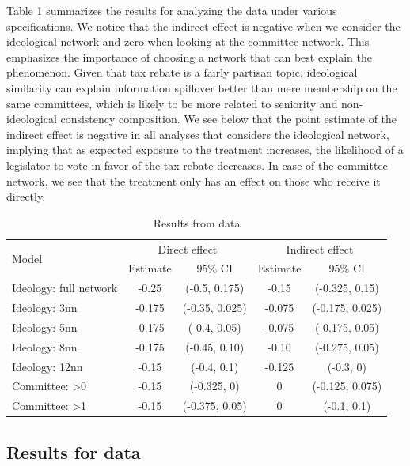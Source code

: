 \documentclass[12pt]{article}
\begin{document}
Table 1 summarizes the results for analyzing the \citet{butler2011can} data under various specifications. We notice that the indirect effect is negative when we consider the ideological network and zero when looking at the committee network. This emphasizes the importance of choosing a network that can best explain the phenomenon. Given that tax rebate is a fairly partisan topic, ideological similarity can explain information spillover better than mere membership on the same committees, which is likely to be more related to seniority and non-ideological consistency composition. We see below that the point estimate of the indirect effect is negative in all analyses that considers the ideological network, implying that as expected exposure to the treatment increases, the likelihood of a legislator to vote in favor of the tax rebate decreases. In case of the committee network, we see that the treatment only has an effect on those who receive it directly.

\begin{table}[h]
\centering
\begin{tabular}{lcccc}
\toprule
\multirow{2}{*}{Model} & \multicolumn{2}{c}{Direct effect} & \multicolumn{2}{c}{Indirect effect} \\
\cmidrule(l){2-3} \cmidrule(l){4-5}
 & Estimate & 95\% CI & Estimate & 95\% CI \\
\midrule
Ideology: full network  & -0.25 & (-0.5, 0.175) & -0.15 & (-0.325, 0.15)\\
Ideology: 3nn & -0.175 & (-0.35, 0.025) & -0.075 & (-0.175, 0.025)\\
Ideology: 5nn & -0.175 & (-0.4, 0.05) & -0.075 & (-0.175, 0.05)\\
Ideology: 8nn & -0.175 & (-0.45, 0.10) & -0.10 & (-0.275, 0.05)\\
Ideology: 12nn & -0.15 &(-0.4,  0.1) & -0.125 & (-0.3, 0)\\
Committee: >0& -0.15 & (-0.325, 0) & 0 & (-0.125, 0.075)\\
Committee: >1 & -0.15 & (-0.375, 0.05) & 0 & (-0.1, 0.1)\\
\bottomrule
\end{tabular}
\caption{Results from \citet{coppock2014information} data}
\end{table}




\subsection{Results for \citet{bergan2015call} data}
\end{document}
